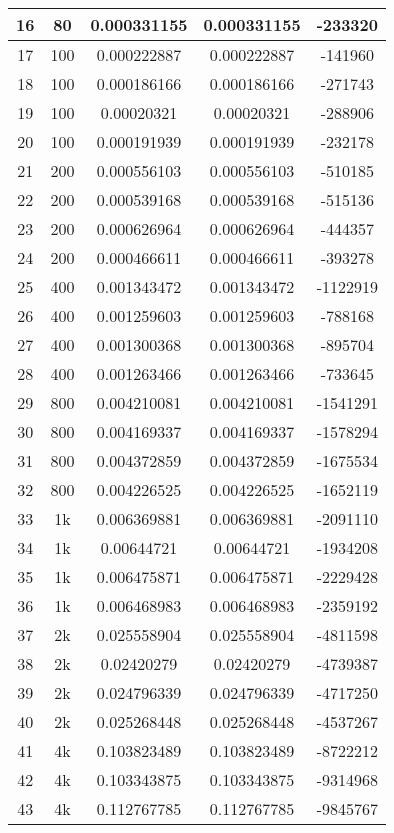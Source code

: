 \begin{center}
\begin{longtable}{|c|c|c|c|c|}
		16 & 80 & 0.000331155 & 0.000331155 & -233320\\
		\hline
		17 & 100 & 0.000222887 & 0.000222887 & -141960\\
		18 & 100 & 0.000186166 & 0.000186166 & -271743\\
		19 & 100 & 0.00020321 & 0.00020321 & -288906\\
		20 & 100 & 0.000191939 & 0.000191939 & -232178\\
		\hline
		21 & 200 & 0.000556103 & 0.000556103 & -510185\\
		22 & 200 & 0.000539168 & 0.000539168 & -515136\\
		23 & 200 & 0.000626964 & 0.000626964 & -444357\\
		24 & 200 & 0.000466611 & 0.000466611 & -393278\\
		\hline
		25 & 400 & 0.001343472 & 0.001343472 & -1122919\\
		26 & 400 & 0.001259603 & 0.001259603 & -788168\\
		27 & 400 & 0.001300368 & 0.001300368 & -895704\\
		28 & 400 & 0.001263466 & 0.001263466 & -733645\\
		\hline
		29 & 800 & 0.004210081 & 0.004210081 & -1541291\\
		30 & 800 & 0.004169337 & 0.004169337 & -1578294\\
		31 & 800 & 0.004372859 & 0.004372859 & -1675534\\
		32 & 800 & 0.004226525 & 0.004226525 & -1652119\\
		\hline
		33 & 1k & 0.006369881 & 0.006369881 & -2091110\\
		34 & 1k & 0.00644721 & 0.00644721 & -1934208\\
		35 & 1k & 0.006475871 & 0.006475871 & -2229428\\
		36 & 1k & 0.006468983 & 0.006468983 & -2359192\\
		\hline
		37 & 2k & 0.025558904 & 0.025558904 & -4811598\\
		38 & 2k & 0.02420279 & 0.02420279 & -4739387\\
		39 & 2k & 0.024796339 & 0.024796339 & -4717250\\
		40 & 2k & 0.025268448 & 0.025268448 & -4537267\\
		\hline
		41 & 4k & 0.103823489 & 0.103823489 & -8722212\\
		42 & 4k & 0.103343875 & 0.103343875 & -9314968\\
		43 & 4k & 0.112767785 & 0.112767785 & -9845767\\

\end{longtable}
\end{center}
